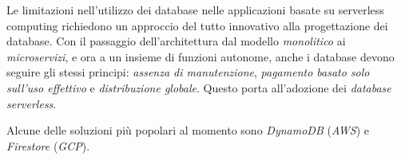 Le limitazioni nell'utilizzo dei database nelle applicazioni basate su serverless computing richiedono un approccio del tutto innovativo alla progettazione dei database. Con il passaggio dell'architettura dal modello \textit{monolitico} ai \textit{microservizi}, e ora a un insieme di funzioni autonome, anche i database devono seguire gli stessi principi: \textit{assenza di manutenzione}, \textit{pagamento basato solo sull'uso effettivo} e \textit{distribuzione globale}. Questo porta all'adozione dei \textit{database serverless}.\cite{naumenko2021analysis}

Alcune delle soluzioni più popolari al momento sono \textit{DynamoDB} (\textit{AWS}) e \textit{Firestore} (\textit{GCP}).